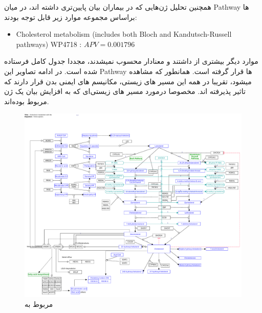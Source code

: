 \documentclass[12pt]{article}
\begin{document}
همچنین تحلیل ژن‌هایی که در بیماران بیان پایین‌تری داشته اند، در میان Pathway ها براساس مجموعه  موارد زیر قابل توجه بودند:
\begin{latin}
\begin{itemize}
	\item  {Cholesterol metabolism (includes both Bloch and Kandutsch-Russell pathways) WP4718} : $APV = 0.001796$
\end{itemize}
\end{latin}
موارد دیگر  بیشتری از 
 داشتند و معنادار محسوب نمیشدند، مجددا جدول کامل فرستاده شده است.
در ادامه تصاویر این Pathway ها قرار گرفته است. همانطور که مشاهده میشود، تقریبا در همه این مسیر های زیستی، مکانیسم های ایمنی بدن قرار دارند که تاثیر پذیرفته اند. مخصوصا درمورد مسیر های زیستی‌ای که به افزایش بیان یک ژن مربوط بوده‌اند.
\newpage
\begin{figure}[h!]
	\centering	
	\includegraphics[width = 1.1 \textwidth ]{./Results/path5.pdf}
	\caption{
مربوط به 
}
	\label{fig:path_down}
\end{figure}
\end{document}
